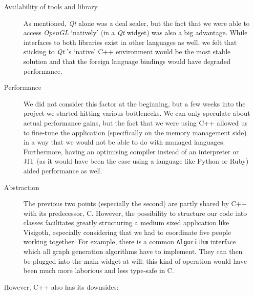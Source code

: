 \documentclass[a4paper,11pt,titlepage]{article}
\newcommand{\code}[1]{\texttt{#1}}
\newcommand{\buzz}[1]{\emph{#1}}
\newcommand{\Qt}{\buzz{Qt} }
\newcommand{\OpenGL}{\buzz{OpenGL} }
\begin{document}
\begin{description}

\item [Availability of tools and library] As mentioned, \Qt alone was
  a deal sealer, but the fact that we were able to access \OpenGL
  `natively' (in a \Qt widget) was also a big advantage. While
  interfaces to both libraries exist in other languages as well, we
  felt that sticking to \Qt's `native' C++ environment would be the
  most stable solution and that the foreign language bindings would
  have degraded performance.

\item [Performance] We did not consider this factor at the beginning,
  but a few weeks into the project we started hitting various
  bottlenecks. We can only speculate about actual performance gains,
  but the fact that we were using
  C++ allowed us to fine-tune the application (specifically on the
  memory management side) in a way that we would not be able to do
  with managed languages. Furthermore, having an optimising compiler
  instead of an interpreter or JIT (as it would have been the case
  using a language like Python or Ruby) aided performance as well.

\item [Abstraction] The previous two points (especially the second)
  are partly shared by C++ with its predecessor, C. However, the
  possibility to structure our code into classes facilitates greatly
  structuring a medium sized application like Visigoth, especially
  considering that we had to coordinate five people working together.
  For example, there is a common \code{Algorithm} interface which all
  graph generation algorithms have to implement. They can then
  be plugged into the main widget at will: this kind of operation
  would have been much more laborious and less type-safe in C.

\end{description}

However, C++ also has its downsides:
\end{document}
